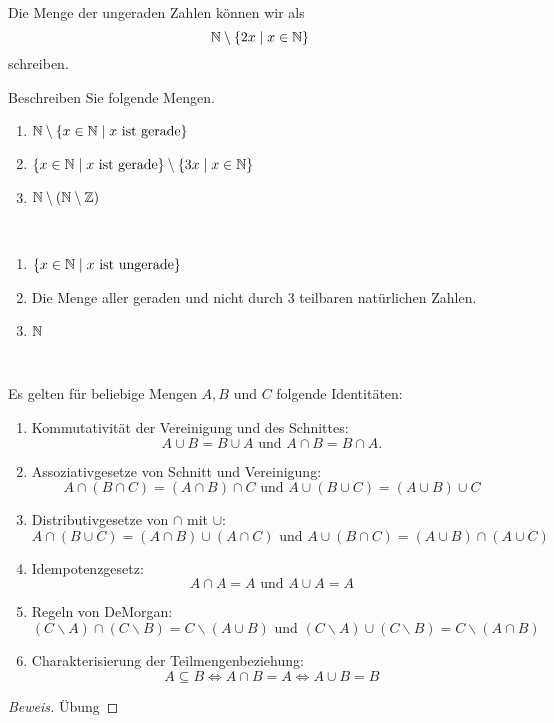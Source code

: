 \begin{bsp}
Die Menge der ungeraden Zahlen können wir als
\[
\mathbb{N}\setminus\{2x\mid x\in\mathbb{N}\}
\]
schreiben.
\end{bsp}

\begin{ueb}
Beschreiben Sie folgende Mengen.
\begin{enumerate}
\item $\mathbb{N}\setminus\{x\in\mathbb{N}\mid x \text{ ist gerade} \}$
\item $\{x\in\mathbb{N}\mid x\text{ ist gerade} \}\setminus \{3x\mid x\in \mathbb{N} \}$
\item $\mathbb{N}\setminus (\mathbb{N}\setminus \mathbb{Z})$
\end{enumerate}
\end{ueb}
\begin{lsg}
{~
\begin{enumerate}
\item $\{x\in \mathbb{N}\mid x\text{ ist ungerade} \}$
\item Die Menge aller geraden und nicht durch $3$ teilbaren natürlichen Zahlen.
\item $\mathbb{N}$
\end{enumerate}
}
{~
\answerspace{4cm}}
\end{lsg}

\begin{satz}[Rechenregeln]
 Es gelten für beliebige Mengen $A,B$ und $C$ folgende Identitäten:
\begin{enumerate}
 \item Kommutativität der Vereinigung und des Schnittes:
\[
 A\cup B=B\cup A\text{ und }A\cap B=B\cap A.
\]
\item Assoziativgesetze von Schnitt und Vereinigung:
\[
 A\cap(B\cap C)=(A\cap B)\cap C\text{ und }A\cup(B\cup C)=(A\cup B)\cup C
\]

\item Distributivgesetze von $\cap$ mit $\cup$:
\[
 A\cap(B\cup C)=(A\cap B)\cup (A\cap C)\text{ und }A\cup(B\cap C)=(A\cup B)\cap (A\cup C)
\]
\item Idempotenzgesetz:
\[
 A\cap A=A\text{ und }A\cup A=A
\]
\item Regeln von DeMorgan:
\[
 (C\backslash A)\cap (C\backslash B)=C\backslash (A\cup B)\text{ und }(C\backslash A)\cup (C\backslash B)=C\backslash (A\cap B)
\]
\item Charakterisierung der Teilmengenbeziehung:
\[
A\subseteq B\Leftrightarrow A\cap B= A\Leftrightarrow A\cup B=B
\]
\end{enumerate}
\end{satz}
\begin{proof}[Beweis]
 Übung
\end{proof}


